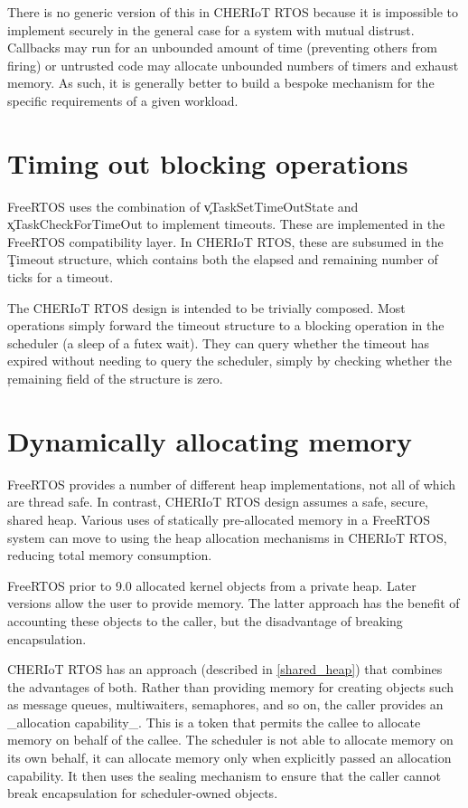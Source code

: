 There is no generic version of this in CHERIoT RTOS because it is impossible to implement securely in the general case for a system with mutual distrust.
Callbacks may run for an unbounded amount of time (preventing others from firing) or untrusted code may allocate unbounded numbers of timers and exhaust memory.
As such, it is generally better to build a bespoke mechanism for the specific requirements of a given workload.

\section{Timing out blocking operations}

FreeRTOS uses the combination of \c{vTaskSetTimeOutState} and \c{xTaskCheckForTimeOut} to implement timeouts.
These are implemented in the FreeRTOS compatibility layer.
In CHERIoT RTOS, these are subsumed in the \c{Timeout} structure, which contains both the elapsed and remaining number of ticks for a timeout.

The CHERIoT RTOS design is intended to be trivially composed.
Most operations simply forward the timeout structure to a blocking operation in the scheduler (a sleep of a futex wait).
They can query whether the timeout has expired without needing to query the scheduler, simply by checking whether the \c{remaining} field of the structure is zero.

\section{Dynamically allocating memory}

FreeRTOS provides a number of different heap implementations, not all of which are thread safe.
In contrast, CHERIoT RTOS design assumes a safe, secure, shared heap.
Various uses of statically pre-allocated memory in a FreeRTOS system can move to using the heap allocation mechanisms in CHERIoT RTOS, reducing total memory consumption.

FreeRTOS prior to 9.0 allocated kernel objects from a private heap.
Later versions allow the user to provide memory.
The latter approach has the benefit of accounting these objects to the caller, but the disadvantage of breaking encapsulation.

CHERIoT RTOS has an approach (described in \ref{shared_heap}) that combines the advantages of both.
Rather than providing memory for creating objects such as message queues, multiwaiters, semaphores, and so on, the caller provides an _allocation capability_.
This is a token that permits the callee to allocate memory on behalf of the callee.
The scheduler is not able to allocate memory on its own behalf, it can allocate memory only when explicitly passed an allocation capability.
It then uses the sealing mechanism to ensure that the caller cannot break encapsulation for scheduler-owned objects.

